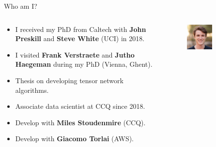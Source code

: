 \begin{frame}{Who am I?}

\begin{columns}

  \begin{column}[T, onlytextwidth]{.6\textwidth}%

    \setlength{\partopsep}{0pt}%

    \begin{itemize}[<+->]

      \item I received my PhD from Caltech with \textbf{John Preskill} and \textbf{Steve White} (UCI) in 2018.
      \item I visited \textbf{Frank Verstraete} and \textbf{Jutho Haegeman} during my PhD (Vienna, Ghent).
      \item Thesis on developing tensor network algorithms.
      \item Associate data scientist at CCQ since 2018.
      \item Develop  with \textbf{Miles Stoudenmire} (CCQ).
      \item Develop  with \textbf{Giacomo Torlai} (AWS).

    \end{itemize}

  \end{column}

  \begin{column}[T]{0.3\textwidth}

    \begin{figure}[T]

      \includegraphics[width=0.6\textwidth]{
        slides/assets/who-am-i-fishman.jpg
      }
      \caption{}


\end{figure}
\end{column}
\end{columns}
\end{frame}
